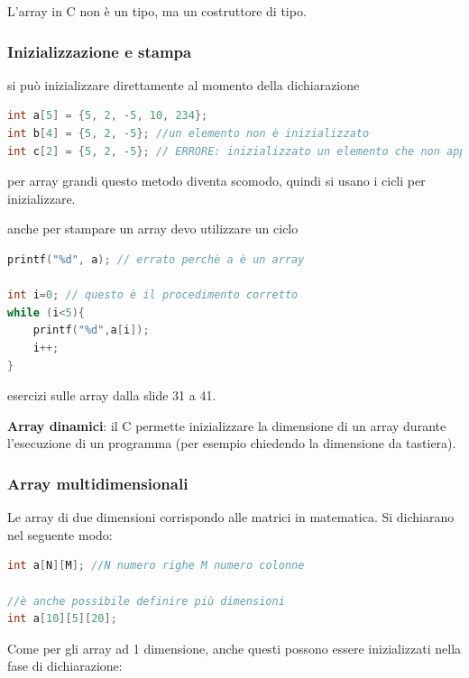 \documentclass[
  paper=a4,
  oneside  ,captions=tableheading
]{scrbook}
\begin{document}
L'array in C non è un tipo, ma un costruttore di tipo.

\hypertarget{inizializzazione-e-stampa}{%
\subsubsection{Inizializzazione e
stampa}\label{inizializzazione-e-stampa}}

si può inizializzare direttamente al momento della dichiarazione

\begin{lstlisting}[language={C++}]
int a[5] = {5, 2, -5, 10, 234};
int b[4] = {5, 2, -5}; //un elemento non è inizializzato
int c[2] = {5, 2, -5}; // ERRORE: inizializzato un elemento che non appartiene all'array
\end{lstlisting}

per array grandi questo metodo diventa scomodo, quindi si usano i cicli
per inizializzare.

anche per stampare un array devo utilizzare un ciclo

\begin{lstlisting}[language={C++}]
printf("%d", a); // errato perchè a è un array

int i=0; // questo è il procedimento corretto
while (i<5){
    printf("%d",a[i]);
    i++;
} 
\end{lstlisting}

esercizi sulle array dalla slide 31 a 41.

\textbf{Array dinamici}: il C permette inizializzare la dimensione di un
array durante l'esecuzione di un programma (per esempio chiedendo la
dimensione da tastiera).

\hypertarget{array-multidimensionali}{%
\subsubsection{Array multidimensionali}\label{array-multidimensionali}}

Le array di due dimensioni corrispondo alle matrici in matematica. Si
dichiarano nel seguente modo:

\begin{lstlisting}[language={C++}]
int a[N][M]; //N numero righe M numero colonne

//è anche possibile definire più dimensioni
int a[10][5][20];
\end{lstlisting}

Come per gli array ad 1 dimensione, anche questi possono essere
inizializzati nella fase di dichiarazione:
\end{document}
